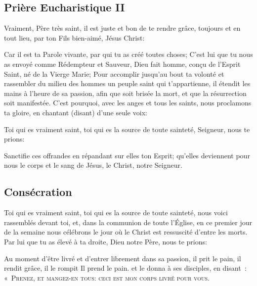 
\subsection*{Prière Eucharistique II}\label{pe2}

Vraiment, Père très saint,
il est juste et bon de te rendre grâce,
toujours et en tout lieu,
par ton Fils bien-aimé, Jésus Christ:

Car il est ta Parole vivante,
par qui tu as créé toutes choses;
C'est lui que tu nous as envoyé
comme Rédempteur et Sauveur,
Dieu fait homme, conçu de l'Esprit Saint,
né de la Vierge Marie;
Pour accomplir jusqu'au bout ta volonté
et rassembler du milieu des hommes
un peuple saint qui t'appartienne,
il étendit les mains à l'heure de sa passion,
afin que soit brisée la mort,
et que la résurrection soit manifestée.
C'est pourquoi,
avec les anges et tous les saints,
nous proclamons ta gloire,
en chantant (disant) d'une seule voix:




Toi qui es vraiment saint,
toi qui es la source de toute sainteté,
Seigneur, nous te prions:


Sanctifie ces offrandes
en répandant sur elles ton Esprit; 
qu'elles deviennent pour nous 
le corps et le sang de Jésus, le Christ, notre Seigneur.

\subsection*{Consécration}

Toi qui es vraiment saint,
toi qui es la source de toute sainteté,
nous voici rassemblés devant toi,
et, dans la communion de toute l'Église,
en ce premier jour de la semaine
nous célébrons le jour
où le Christ est ressuscité d'entre les morts.
Par lui que tu as élevé à ta droite,
Dieu notre Père, nous te prions:

Au moment d'être livré
et d'entrer librement dans sa passion,
il prit le pain, il rendit grâce, il le rompit Il prend le pain.
et le donna à ses disciples, en disant~:
\textsc{«~Prenez, et mangez-en tous:} 
\textsc{ceci est mon corps livré pour vous.~\fg}

